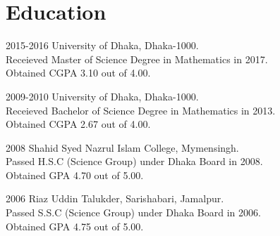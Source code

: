 \documentclass[a4paper]{article}
\begin{document}
\section{Education}

\begin{CV}
\item[2015-2016] University of Dhaka, Dhaka-1000.\\Receieved Master of Science Degree in Mathematics in 2017.\\Obtained CGPA 3.10 out of 4.00.
\item[2009-2010] University of Dhaka, Dhaka-1000.\\Receieved Bachelor of Science Degree in Mathematics in 2013.\\Obtained CGPA 2.67 out of 4.00.
\item[2008] Shahid Syed Nazrul Islam College, Mymensingh.\\Passed H.S.C (Science Group) under Dhaka Board in 2008.\\Obtained GPA 4.70 out of 5.00.
\item[2006] Riaz Uddin Talukder, Sarishabari, Jamalpur.\\Passed S.S.C (Science Group) under Dhaka Board in 2006.\\Obtained GPA 4.75 out of 5.00.
\end{CV}




\end{document}
